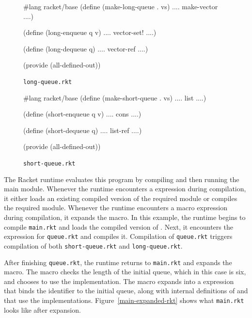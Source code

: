 \documentclass[ms,electronic,letterpaper,lol,lof,lot]{byumsphd}
\begin{document}
\begin{figure}[h]
\begin{schemedisplay}
#lang racket/base
(define (make-long-queue . vs)
  .... make-vector ....)

(define (long-enqueue q v)
  .... vector-set! ....)

(define (long-dequeue q)
  .... vector-ref ....)

(provide (all-defined-out))
\end{schemedisplay}
\caption{\texttt{long-queue.rkt}}
\label{long-queue-rkt}
\end{figure}

\begin{figure}[h]
\begin{schemedisplay}
#lang racket/base
(define (make-short-queue . vs)
  .... list ....)

(define (short-enqueue q v)
  .... cons ....)

(define (short-dequeue q)
  .... list-ref ....)

(provide (all-defined-out))
\end{schemedisplay}
\caption{\texttt{short-queue.rkt}}
\label{short-queue-rkt}
\end{figure}

The Racket runtime evaluates this program by compiling and then running the main module.
Whenever the runtime encounters a  expression during compilation, it either loads an existing compiled version of the required module or compiles the required module.
Whenever the runtime encounters a macro expression during compilation, it expands the macro.
In this example, the runtime begins to compile \texttt{main.rkt} and loads the compiled version of . 
Next, it encounters the  expression for \texttt{queue.rkt} and compiles it.
Compilation of \texttt{queue.rkt} triggers compilation of both \texttt{short-queue.rkt} and \texttt{long-queue.rkt}. 

After finishing \texttt{queue.rkt}, the runtime returns to \texttt{main.rkt} and expands the  macro.
The  macro checks the length of the initial queue, which in this case is six, and chooses to use the  implementation.
The macro expands into a  expression that binds the identifier  to the initial queue, along with internal definitions of  and  that use the  implementations.
Figure~\ref{main-expanded-rkt} shows what \texttt{main.rkt} looks like after expansion.
\end{document}
